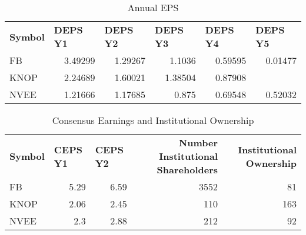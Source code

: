 \documentclass{article}
\begin{document}
\begin{table}[htbp]
  \caption{Annual EPS}
    \begin{tabular}{lrrrrr}
    \textbf{Symbol} & \multicolumn{1}{l}{\textbf{DEPS Y1}} & \multicolumn{1}{l}{\textbf{DEPS Y2}} & \multicolumn{1}{l}{\textbf{DEPS Y3}} & \multicolumn{1}{l}{\textbf{DEPS Y4}} & \multicolumn{1}{l}{\textbf{DEPS Y5}} \\
    FB    & 3.49299 & 1.29267 & 1.1036 & 0.59595 & 0.01477 \\
    KNOP  & 2.24689 & 1.60021 & 1.38504 & 0.87908 &  \\
    NVEE  & 1.21666 & 1.17685 & 0.875 & 0.69548 & 0.52032 \\
    \end{tabular}%
  \label{tab:addlabel}%
\end{table}%

\begin{table}[htbp]
  \caption{Consensus Earnings and Institutional Ownership}
    \begin{tabular}{lrrrr}
    \textbf{Symbol} & \multicolumn{1}{l}{\textbf{CEPS Y1}} & \multicolumn{1}{l}{\textbf{CEPS Y2}} & \multicolumn{1}{p{4.215em}}{\textbf{Number Institutional Shareholders}} & \multicolumn{1}{p{4.215em}}{\textbf{Institutional Ownership}} \\
    FB    & 5.29  & 6.59  & 3552  & 81 \\
    KNOP  & 2.06  & 2.45  & 110   & 163 \\
    NVEE  & 2.3   & 2.88  & 212   & 92 \\
    \end{tabular}%
  \label{tab:addlabel}%
\end{table}%
\end{document}
